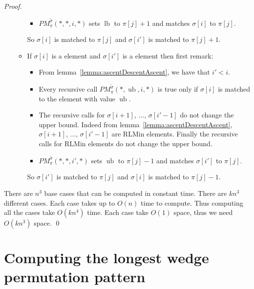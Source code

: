 \documentclass[a4paper]{llncs}
\newcommand{\RLMax}{\text{RLMax}\xspace}
\newcommand{\ptext}{\pi}
\newcommand{\ppattern}{\sigma}
\newcommand{\PM}{PM}
\DeclareMathOperator{\lb}{lb}
\DeclareMathOperator{\ub}{ub}
\begin{document}
\begin{proof}
\begin{itemize}
\begin{itemize}
\begin{itemize}
				\item $\PM^{\widetilde{\sigma}}_{\ptext}(*,*,i,*)$ sets $\lb$ to $\ptext[j]+1$ and matches $\sigma[i]$ to $\ptext[j]$.

			\end{itemize}
			So $\sigma[i]$ is matched to $\ptext[j]$ and
			$\sigma[i']$ is matched to $\ptext[j]+1$.


			\item If $\ppattern[i]$ is a \RLMax element and $\ppattern[i']$ is a \RLMax element then
			first remark:
			\begin{itemize}
				\item From lemma~\ref{lemma:ascentDescentAscent},
				we have that $i'<i$.

				\item  Every recursive call $\PM^{\widetilde{\sigma}}_{\ptext}(*,\ub,i,*)$ is true only if $\sigma[i]$ is matched to the element with value $\ub$.

				\item  The recursive calls for $\sigma[i+1]$, $\ldots$, $\sigma[i'-1]$ do not change the upper bound. Indeed
				from lemma~\ref{lemma:ascentDescentAscent}, $\sigma[i+1]$,  $\ldots$, $\sigma[i'-1]$ are RLMin elements. Finally the recursive calls for RLMin elements do not change the upper bound.

				\item $\PM^{\widetilde{\sigma}}_{\ptext}(*,*,i',*)$ sets $\ub$ to $\ptext[j]-1$ and matches $\sigma[i']$ to $\ptext[j]$.

			\end{itemize}
			So $\sigma[i']$ is matched to $\ptext[j]$ and
			$\sigma[i]$ is matched to $\ptext[j]-1$.


		\end{itemize}
\end{itemize}

There are $n^3$ base cases that can be computed in constant time.
There are $kn^3$ different cases. Each case takes up to $O(n)$ time to compute.
Thus computing all the cases take $O(kn^4)$ time.
Each case take $O(1)$ space, thus we need $O(kn^3)$ space.
\qed
\end{proof}


\section{Computing the longest wedge permutation pattern}
\label{section:LCS}
\end{document}
